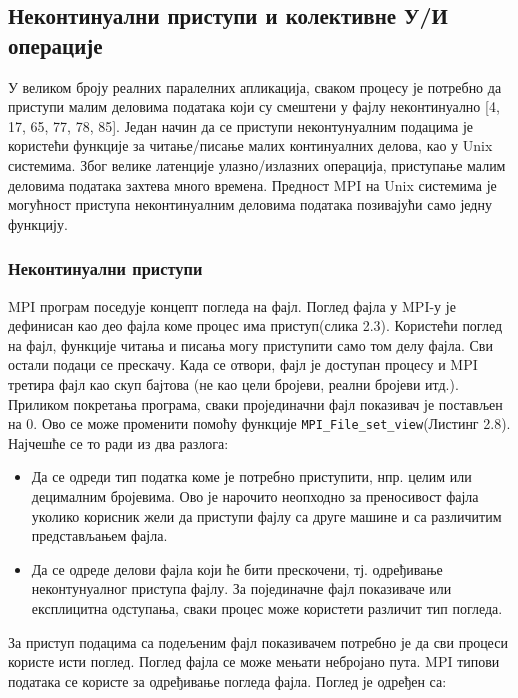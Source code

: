 \subsection{Неконтинуални приступи и колективне У/И операције}

У великом броју реалних паралелних апликација, сваком процесу је потребно да приступи малим деловима података који су смештени у фајлу неконтинуално  [4, 17, 65, 77, 78, 85].
Један начин да се приступи неконтунуалним подацима је користећи функције за читање/писање малих континуалних делова, као у Unix системима. Због велике латенције улазно/излазних операција, приступање малим деловима података захтева много времена. Предност MPI на Unix системима је могућност приступа неконтинуалним деловима података позивајући само једну функцију. 

\subsubsection{Неконтинуални приступи}
MPI програм поседује концепт погледа на фајл. Поглед фајла у MPI-у је дефинисан као део фајла коме процес има приступ(слика 2.3). Користећи поглед на фајл, функције читања и писања могу приступити само том делу фајла. Сви остали подаци се прескачу. Када се отвори, фајл је доступан процесу и MPI третира фајл као скуп бајтова (не као цели бројеви, реални бројеви итд.). Приликом покретања програма, сваки пројединачни фајл показивач је постављен на 0. Ово се може променити помоћу функције \texttt{MPI\_File\_set\_view}(Листинг 2.8). Најчешће се то ради из два разлога:

\begin{itemize}
\item Да се одреди тип податка коме је потребно приступити, нпр. целим или децималним бројевима. 
Ово је нарочито неопходно за преносивост фајла уколико корисник жели да приступи фајлу са друге машине и са различитим представљањем фајла. 

\item Да се одреде делови фајла који ће бити прескочени, тј. одређивање неконтунуалног приступа фајлу. За појединачне фајл показиваче или експлицитна одступања, сваки процес може користети различит тип погледа.
\end{itemize}

За приступ подацима са подељеним фајл показивачем потребно је да сви процеси користе исти поглед. Поглед фајла се може мењати небројано пута.
MPI типови података се користе за одређивање погледа фајла. Поглед је одређен са:

